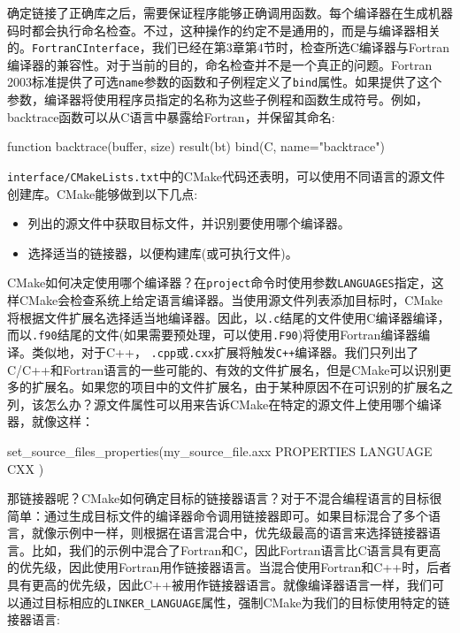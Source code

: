 
确定链接了正确库之后，需要保证程序能够正确调用函数。每个编译器在生成机器码时都会执行命名检查。不过，这种操作的约定不是通用的，而是与编译器相关的。\texttt{FortranCInterface}，我们已经在第3章第4节时，检查所选C编译器与Fortran编译器的兼容性。对于当前的目的，命名检查并不是一个真正的问题。Fortran 2003标准提供了可选\texttt{name}参数的函数和子例程定义了\texttt{bind}属性。如果提供了这个参数，编译器将使用程序员指定的名称为这些子例程和函数生成符号。例如，backtrace函数可以从C语言中暴露给Fortran，并保留其命名:

\begin{codebox}[cmake]
function backtrace(buffer, size) result(bt) bind(C, name="backtrace")
\end{codebox}


\texttt{interface/CMakeLists.txt}中的CMake代码还表明，可以使用不同语言的源文件创建库。CMake能够做到以下几点:

\begin{itemize}
\item 列出的源文件中获取目标文件，并识别要使用哪个编译器。

\item 选择适当的链接器，以便构建库(或可执行文件)。

\end{itemize}

CMake如何决定使用哪个编译器？在\texttt{project}命令时使用参数\texttt{LANGUAGES}指定，这样CMake会检查系统上给定语言编译器。当使用源文件列表添加目标时，CMake将根据文件扩展名选择适当地编译器。因此，以\texttt{.c}结尾的文件使用C编译器编译，而以\texttt{.f90}结尾的文件(如果需要预处理，可以使用\texttt{.F90})将使用Fortran编译器编译。类似地，对于C++， \texttt{.cpp}或\texttt{.cxx}扩展将触发\texttt{C++}编译器。我们只列出了C/C++和Fortran语言的一些可能的、有效的文件扩展名，但是CMake可以识别更多的扩展名。如果您的项目中的文件扩展名，由于某种原因不在可识别的扩展名之列，该怎么办？源文件属性可以用来告诉CMake在特定的源文件上使用哪个编译器，就像这样：

\begin{codebox}[cmake]
set_source_files_properties(my_source_file.axx
  PROPERTIES
    LANGUAGE CXX
  )
\end{codebox}

那链接器呢？CMake如何确定目标的链接器语言？对于不混合编程语言的目标很简单：通过生成目标文件的编译器命令调用链接器即可。如果目标混合了多个语言，就像示例中一样，则根据在语言混合中，优先级最高的语言来选择链接器语言。比如，我们的示例中混合了Fortran和C，因此Fortran语言比C语言具有更高的优先级，因此使用Fortran用作链接器语言。当混合使用Fortran和C++时，后者具有更高的优先级，因此C++被用作链接器语言。就像编译器语言一样，我们可以通过目标相应的\texttt{LINKER\_LANGUAGE}属性，强制CMake为我们的目标使用特定的链接器语言:

